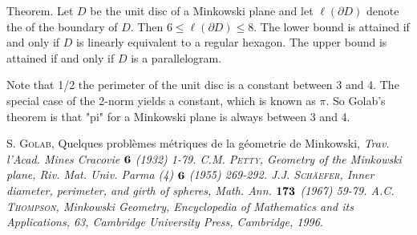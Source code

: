 \documentclass[12pt]{article}
\begin{document}
Theorem.  Let $D$ be the unit disc of a Minkowski plane and let
$\ell(\partial D)$ denote the  of the boundary of $D$. Then
$6 \leq \ell(\partial D) \leq 8$. The lower bound is attained if and only
if $D$ is linearly equivalent to a regular hexagon. The upper bound
is attained if and only if $D$ is a parallelogram.

Note that 1/2 the perimeter of the unit disc is  a constant
between 3 and 4. The special case of the 2-norm yields a constant,
which is known as $\pi$. So Golab's theorem is that "pi" for a 
Minkowski plane is always between 3 and 4.


\begin{thebibliography}{10}
{\scshape S. Golab},  Quelques probl\`emes m\'etriques de la g\'eometrie de Minkowski,
\it{Trav. l'Acad. Mines Cracovie} $\bold{6}$ (1932) 1-79.
{\scshape C.M. Petty}, Geometry of the Minkowski plane, \it{Riv. Mat. Univ. Parma} (4) $\bold{6}$ (1955) 269-292.
{\scshape J.J. Sch\"aefer}, Inner diameter, perimeter, and girth of spheres, 
\it{Math. Ann}. $\bold{173}$ (1967) 59-79.
{\scshape A.C. Thompson}, \it{Minkowski Geometry}, Encyclopedia of Mathematics and its Applications, 63, Cambridge University Press, Cambridge, 1996.
\end{thebibliography}




\end{document}
